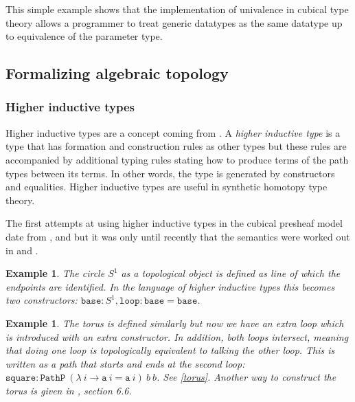 \documentclass[12pt,a4paper,twoside,xetex]{book}
\newcommand{\keyword}[1]{\emph{#1}\index{#1}}
\newtheorem{example}[theorem]{Example}
\newcommand{\op}[1]{\mathtt{#1}}
\begin{document}
This simple example shows that the implementation of univalence in cubical type theory allows a programmer to treat generic datatypes as the same datatype up to equivalence of the parameter type.

\subsection{Formalizing algebraic topology}

\subsubsection{Higher inductive types}\label{hit}

Higher inductive types are a concept coming from \cite{Voevodsky2013}. A \keyword{higher inductive type} is a type that has formation and construction rules  as other types but these rules are accompanied by additional typing rules stating how to produce terms of the path types between its terms. In other words, the type is generated by constructors and equalities. Higher inductive types are useful in synthetic homotopy type theory.

The first attempts at using higher inductive types in the cubical presheaf model date from \cite{Licata2015}, \cite{Huber2016} and \cite{Cohen2016} but it was only until recently that the semantics were worked out in \cite {Lumsdaine2017} and  \cite{Coquand2018}.



\begin{example}
The \keyword{circle} $S^1$ as a topological object is defined as line of which the endpoints are identified. In the language of higher inductive types this becomes two constructors: $\op{base} : S^1,  \op{loop} : \op{base} = \op{base}$.
\end{example}

\begin{example}
The \keyword{torus} is defined similarly but now we have an extra loop which is introduced with an extra constructor. In addition, both loops intersect, meaning that doing one loop is topologically equivalent to talking the other loop. This is written as a path that starts and ends at the second loop: $\op{square} : \op{PathP} \ (\lambda \ i \rightarrow \op{a} \ i = \op{a} \ i) \ b  \ b$. See \cref{torus}. Another way to construct the torus is given in \cite{Voevodsky2013}, section 6.6.
\end{example}
\end{document}
